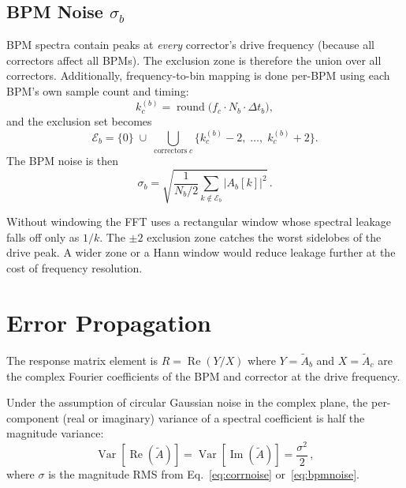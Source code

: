 \documentclass[11pt,a4paper,twoside]{report}
\begin{document}
\subsection{BPM Noise $\sigma_b$}

BPM spectra contain peaks at \emph{every} corrector's drive frequency (because all correctors affect all BPMs). The exclusion zone is therefore the union over all correctors. Additionally, frequency-to-bin mapping is done per-BPM using each BPM's own sample count and timing:
\begin{equation}\label{eq:binmap}
  k_c^{(b)} = \operatorname{round}\!\bigl(f_c \cdot N_b \cdot \Delta t_b\bigr),
\end{equation}
and the exclusion set becomes
\begin{equation}
  \mathcal{E}_b = \{0\} \;\cup\;
  \bigcup_{\text{correctors}\;c}
  \bigl\{k_c^{(b)}{-}2,\;\dots,\;k_c^{(b)}{+}2\bigr\}.
\end{equation}
The BPM noise is then
\begin{equation}\label{eq:bpmnoise}
  \sigma_b = \sqrt{\frac{1}{N_b/2}
    \sum_{k\notin\mathcal{E}_b} \bigl\lvert A_b[k]\bigr\rvert^2}\,.
\end{equation}

\begin{notebox}
Without windowing the FFT uses a rectangular window whose spectral leakage falls off only as $1/k$. The $\pm2$ exclusion zone catches the worst sidelobes of the drive peak. A wider zone or a Hann window would reduce leakage further at the cost of frequency resolution.
\end{notebox}

\section{Error Propagation}\label{sec:error}

The response matrix element is $R = \operatorname{Re}(Y/X)$ where $Y=\tilde{A}_b$ and $X=\tilde{A}_c$ are the complex Fourier coefficients of the BPM and corrector at the drive frequency.

Under the assumption of circular Gaussian noise in the complex plane, the per-component (real or imaginary) variance of a spectral coefficient is half the magnitude variance:
\begin{equation}
  \operatorname{Var}[\operatorname{Re}(\tilde{A})]
  = \operatorname{Var}[\operatorname{Im}(\tilde{A})]
  = \frac{\sigma^2}{2}\,,
\end{equation}
where $\sigma$ is the magnitude RMS from Eq.~\ref{eq:corrnoise} or~\ref{eq:bpmnoise}.
\end{document}

